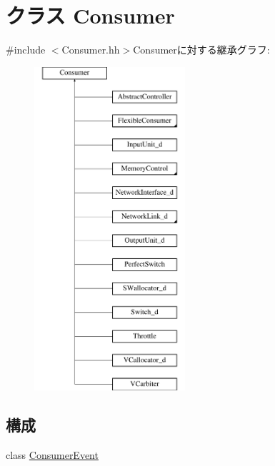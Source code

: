 \hypertarget{classConsumer}{
\section{クラス Consumer}
\label{classConsumer}
}


{\ttfamily \#include $<$Consumer.hh$>$}Consumerに対する継承グラフ:\begin{figure}[H]
\begin{center}
\leavevmode
\includegraphics[height=12cm]{classConsumer}
\end{center}
\end{figure}
\subsection*{構成}
\begin{DoxyCompactItemize}
\item 
class \hyperlink{classConsumer_1_1ConsumerEvent}{ConsumerEvent}
\end{DoxyCompactItemize}
